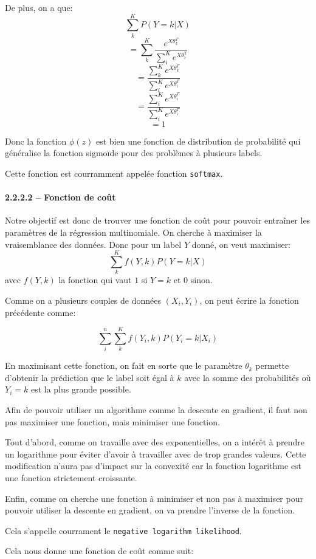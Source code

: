 \documentclass[
]{article}
\begin{document}
De plus, on a que: \[\sum_k^K P(Y = k | X)\]
\[=\sum_k^K \frac{e^{X \theta_k^T}}{\sum_i^K e^{X \theta_i^T}}\]
\[=\frac{\sum_k^Ke^{X \theta_k^T}}{\sum_i^K e^{X \theta_i^T}}\]
\[=\frac{\sum_i^Ke^{X \theta_i^T}}{\sum_i^K e^{X \theta_i^T}}\] \[=1\]

Donc la fonction \(\phi(z)\) est bien une fonction de distribution de
probabilité qui généralise la fonction sigmoïde pour des problèmes à
plusieurs labels.

Cette fonction est courramment appelée fonction \texttt{softmax}.

\paragraph{2.2.2.2 -- Fonction de coût}\label{fonction-de-couxfbt-1}

Notre objectif est donc de trouver une fonction de coût pour pouvoir
entraîner les paramètres de la régression multinomiale. On cherche à
maximiser la vraisemblance des données. Donc pour un label \(Y\) donné,
on veut maximiser: \[\sum_k^K f(Y, k) P(Y = k | X)\] avec \(f(Y, k)\) la
fonction qui vaut \(1\) si \(Y = k\) et \(0\) sinon.

Comme on a plusieurs couples de données \((X_i, Y_i)\), on peut écrire
la fonction précédente comme:

\[\sum_i^n\sum_k^K f(Y_i, k) P(Y_i = k | X_i)\]

En maximisant cette fonction, on fait en sorte que le paramètre
\(\theta_k\) permette d'obtenir la prédiction que le label soit égal à
\(k\) avec la somme des probabilités où \(Y_i = k\) est la plus grande
possible.

Afin de pouvoir utiliser un algorithme comme la descente en gradient, il
faut non pas maximiser une fonction, mais minimiser une fonction.

Tout d'abord, comme on travaille avec des exponentielles, on a intérêt à
prendre un logarithme pour éviter d'avoir à travailler avec de trop
grandes valeurs. Cette modification n'aura pas d'impact sur la convexité
car la fonction logarithme est une fonction strictement croissante.

Enfin, comme on cherche une fonction à minimiser et non pas à maximiser
pour pouvoir utiliser la descente en gradient, on va prendre l'inverse
de la fonction.

Cela s'appelle courrament le \texttt{negative\ logarithm\ likelihood}.

Cela nous donne une fonction de coût comme suit:
\end{document}
